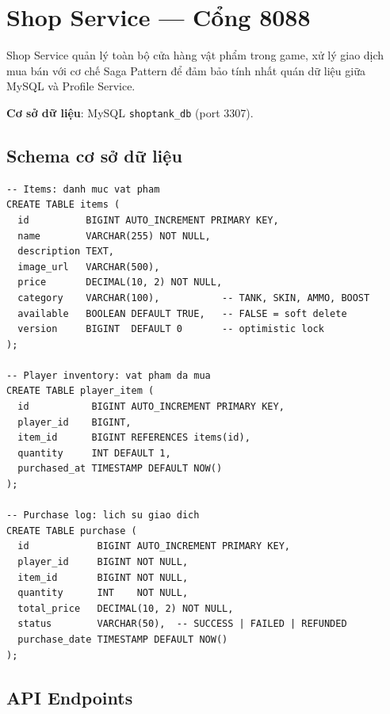 \documentclass[12pt,a4paper]{report}
\begin{document}
\section{Shop Service --- Cổng 8088}

Shop Service quản lý toàn bộ cửa hàng vật phẩm trong game, xử lý giao dịch mua bán với cơ chế Saga Pattern để đảm bảo tính nhất quán dữ liệu giữa MySQL và Profile Service.

\textbf{Cơ sở dữ liệu}: MySQL \texttt{shoptank\_db} (port 3307).

\subsection{Schema cơ sở dữ liệu}

\begin{lstlisting}[style=bashStyle, caption={Schema cơ sở dữ liệu Shop}, label={lst:shopschema}]
-- Items: danh muc vat pham
CREATE TABLE items (
  id          BIGINT AUTO_INCREMENT PRIMARY KEY,
  name        VARCHAR(255) NOT NULL,
  description TEXT,
  image_url   VARCHAR(500),
  price       DECIMAL(10, 2) NOT NULL,
  category    VARCHAR(100),           -- TANK, SKIN, AMMO, BOOST
  available   BOOLEAN DEFAULT TRUE,   -- FALSE = soft delete
  version     BIGINT  DEFAULT 0       -- optimistic lock
);

-- Player inventory: vat pham da mua
CREATE TABLE player_item (
  id           BIGINT AUTO_INCREMENT PRIMARY KEY,
  player_id    BIGINT,
  item_id      BIGINT REFERENCES items(id),
  quantity     INT DEFAULT 1,
  purchased_at TIMESTAMP DEFAULT NOW()
);

-- Purchase log: lich su giao dich
CREATE TABLE purchase (
  id            BIGINT AUTO_INCREMENT PRIMARY KEY,
  player_id     BIGINT NOT NULL,
  item_id       BIGINT NOT NULL,
  quantity      INT    NOT NULL,
  total_price   DECIMAL(10, 2) NOT NULL,
  status        VARCHAR(50),  -- SUCCESS | FAILED | REFUNDED
  purchase_date TIMESTAMP DEFAULT NOW()
);
\end{lstlisting}

\subsection{API Endpoints}
\end{document}
